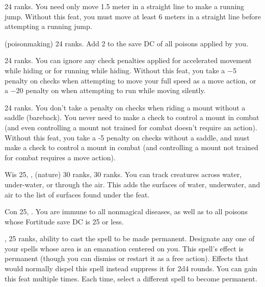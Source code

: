 {}
{ 24 ranks.}
{You need only move 1.5 meter in a straight line to make a running jump.}
{Without this feat, you must move at least 6 meters in a straight line before attempting a running jump.}{}

{ (poisonmaking) 24 ranks.}
{Add 2 to the save DC of all poisons applied by you.}

{}
{ 24 ranks.}
{
  You can ignore any check penalties applied for accelerated movement while hiding or for running while hiding.
}
{
  Without this feat, you take a $-5$ penalty on  checks when attempting to move your full speed as a move action, or a $-20$ penalty on  when attempting to run while moving silently.
}{}

{}
{ 24 ranks.}
{You don't take a penalty on  checks when riding a mount without a saddle (bareback). You never need to make a  check to control a mount in combat (and even controlling a mount not trained for combat doesn't require an action).}
{Without this feat, you take a -5 penalty on  checks without a saddle, and must make a  check to control a mount in combat (and controlling a mount not trained for combat requires a move action).}{}

{Wis 25, ,  (nature) 30 ranks,  30 ranks.}
{You can track creatures across water, under-water, or through the air. This adds the surfaces of water, underwater, and air to the list of surfaces found under the  feat.}


{Con 25, .}
{You are immune to all nonmagical diseases, as well as to all poisons whose Fortitude save DC is 25 or less.}

{}
{,  25 ranks, ability to cast the spell to be made permanent.}
{Designate any one of your spells whose area is an emanation centered on you. This spell's effect is permanent (though you can dismiss or restart it as a free action). Effects that would normally dispel this spell instead suppress it for 2d4 rounds.}
{}{You can gain this feat multiple times. Each time, select a different spell to become permanent.}

